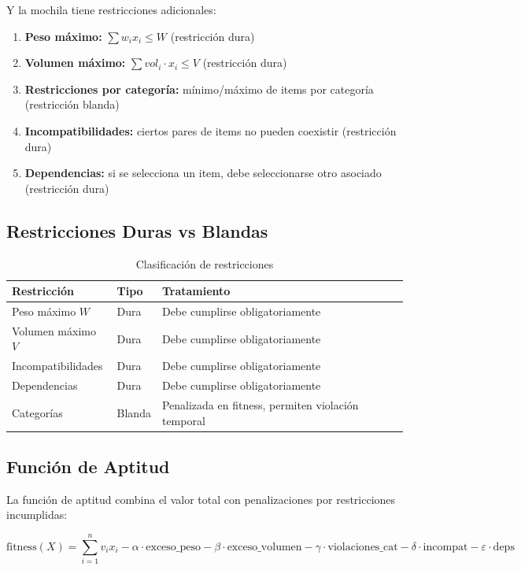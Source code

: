 \documentclass[12pt,a4paper]{article}
\begin{document}
Y la mochila tiene restricciones adicionales:

\begin{enumerate}
  \item \textbf{Peso m\'aximo:} $\sum w_i x_i \leq W$ (restricci\'on dura)
  \item \textbf{Volumen m\'aximo:} $\sum vol_i \cdot x_i \leq V$ (restricci\'on dura)
  \item \textbf{Restricciones por categor\'ia:} m\'inimo/m\'aximo de items por categor\'ia (restricci\'on blanda)
  \item \textbf{Incompatibilidades:} ciertos pares de items no pueden coexistir (restricci\'on dura)
  \item \textbf{Dependencias:} si se selecciona un item, debe seleccionarse otro asociado (restricci\'on dura)
\end{enumerate}

\subsection{Restricciones Duras vs Blandas}

\begin{table}[H]
\centering
\caption{Clasificaci\'on de restricciones}
\begin{tabular}{lll}
\toprule
\textbf{Restricci\'on} & \textbf{Tipo} & \textbf{Tratamiento} \\
\midrule
Peso m\'aximo $W$ & Dura & Debe cumplirse obligatoriamente \\
Volumen m\'aximo $V$ & Dura & Debe cumplirse obligatoriamente \\
Incompatibilidades & Dura & Debe cumplirse obligatoriamente \\
Dependencias & Dura & Debe cumplirse obligatoriamente \\
Categor\'ias & Blanda & Penalizada en fitness, permiten violaci\'on temporal \\
\bottomrule
\end{tabular}
\end{table}

\subsection{Funci\'on de Aptitud}

La funci\'on de aptitud combina el valor total con penalizaciones por restricciones incumplidas:

\[
\text{fitness}(X) = \sum_{i=1}^{n} v_i x_i - \alpha \cdot \text{exceso\_peso} - \beta \cdot \text{exceso\_volumen} - \gamma \cdot \text{violaciones\_cat} - \delta \cdot \text{incompat} - \varepsilon \cdot \text{deps}
\]
\end{document}
